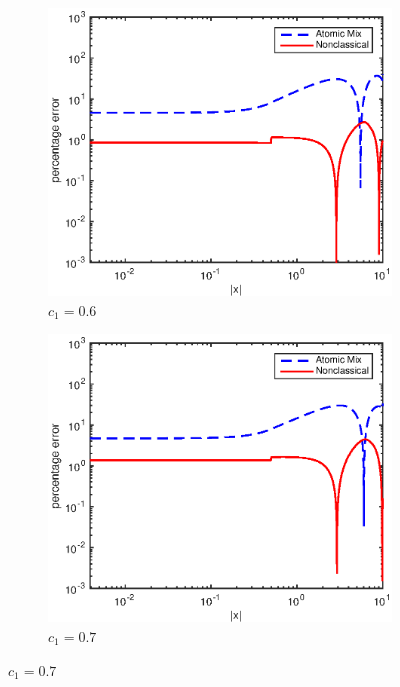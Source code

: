 \documentclass[12pt]{article}
\begin{document}
{\begin{figure}[p]
    \centering
    \begin{subfigure}{0.495\textwidth}
        \centering
        \includegraphics[width=\textwidth]{NSE_err_F60.eps}
        \caption{$c_1 = 0.6$}
        \label{figerrF60}
    \end{subfigure}
    \hfill
    \begin{subfigure}{0.495\textwidth}
        \centering
        \includegraphics[width=\textwidth]{NSE_err_F70.eps}
        \caption{$c_1 = 0.7$}

\end{subfigure}
\end{figure}}
\end{document}
